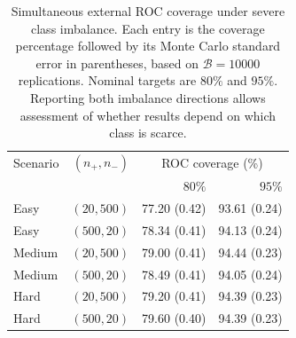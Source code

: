 \begin{table}[t]
\centering
\caption{Simultaneous external ROC coverage under severe class imbalance. Each entry is the coverage percentage followed by its Monte Carlo standard error in parentheses, based on $\mathcal B=10000$ replications. Nominal targets are $80\%$ and $95\%$. Reporting both imbalance directions allows assessment of whether results depend on which class is scarce.}
\label{tab:class-counts-severe-imbalance-roc}
\begingroup
\small
\setlength{\tabcolsep}{7pt}
\renewcommand{\arraystretch}{1.12}
\begin{tabular}{@{}lrrr@{}}
\hline
Scenario & $(n_+,n_-)$ & \multicolumn{2}{c}{ROC coverage (\%)} \\
 & & $80\%$ & $95\%$ \\
\hline
Easy & $(20,500)$ & 77.20 (0.42) & 93.61 (0.24) \\
Easy & $(500,20)$ & 78.34 (0.41) & 94.13 (0.24) \\
Medium & $(20,500)$ & 79.00 (0.41) & 94.44 (0.23) \\
Medium & $(500,20)$ & 78.49 (0.41) & 94.05 (0.24) \\
Hard & $(20,500)$ & 79.20 (0.41) & 94.39 (0.23) \\
Hard & $(500,20)$ & 79.60 (0.40) & 94.39 (0.23) \\
\hline
\end{tabular}
\endgroup
\end{table}
